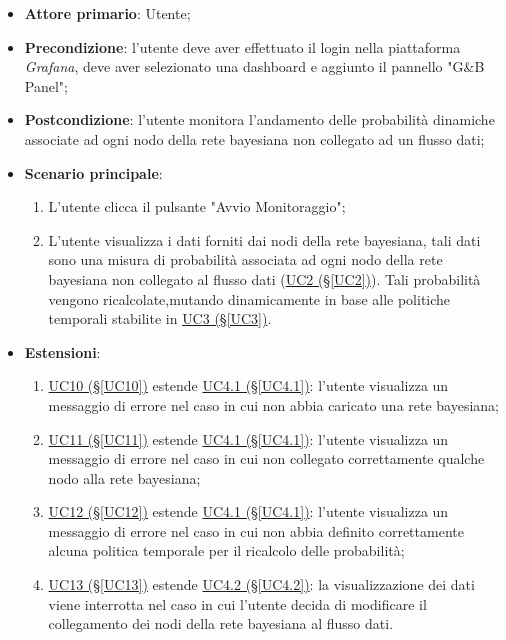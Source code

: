 \begin{itemize}
\item \textbf{Attore primario}: Utente;
\item \textbf{Precondizione}: l'utente deve aver effettuato il login nella piattaforma \textit{Grafana}, deve aver selezionato una dashboard e aggiunto il pannello "G\&B Panel";
\item \textbf{Postcondizione}: l'utente monitora l'andamento delle probabilità dinamiche associate ad ogni nodo della rete bayesiana non collegato ad un flusso dati;
\item \textbf{Scenario principale}: 
	\begin{enumerate}
	\item L'utente clicca il pulsante "Avvio Monitoraggio";
	\item L'utente visualizza i dati forniti dai nodi della rete bayesiana, tali dati sono una misura di probabilità 			associata ad ogni nodo della rete bayesiana non collegato al flusso dati (\hyperref[UC2]{UC2 (§\ref*{UC2})}). 				Tali probabilità vengono ricalcolate,mutando dinamicamente in base alle politiche temporali stabilite in 						\hyperref[UC3]{UC3 (§\ref*{UC3})}.
	\end{enumerate}
\item \textbf{Estensioni}:
	\begin{enumerate}
	\item \hyperref[UC10]{UC10 (§\ref*{UC10})} estende \hyperref[UC4.1]{UC4.1 (§\ref*{UC4.1})}: l'utente visualizza un messaggio di errore nel caso in cui non abbia caricato una rete bayesiana;
	\item \hyperref[UC11]{UC11 (§\ref*{UC11})} estende \hyperref[UC4.1]{UC4.1 (§\ref*{UC4.1})}: l'utente visualizza un messaggio di errore nel caso in cui non collegato correttamente qualche nodo alla rete bayesiana;
	\item \hyperref[UC12]{UC12 (§\ref*{UC12})} estende \hyperref[UC4.1]{UC4.1 (§\ref*{UC4.1})}: l'utente visualizza un messaggio di errore nel caso in cui non abbia definito correttamente alcuna politica temporale per il ricalcolo delle probabilità;
	\item \hyperref[UC13]{UC13 (§\ref*{UC13})} estende \hyperref[UC4.2]{UC4.2 (§\ref*{UC4.2})}: la visualizzazione dei dati viene interrotta nel caso in cui l'utente decida di modificare il collegamento dei nodi della rete bayesiana al flusso dati.
	\end{enumerate}
\end{itemize}

